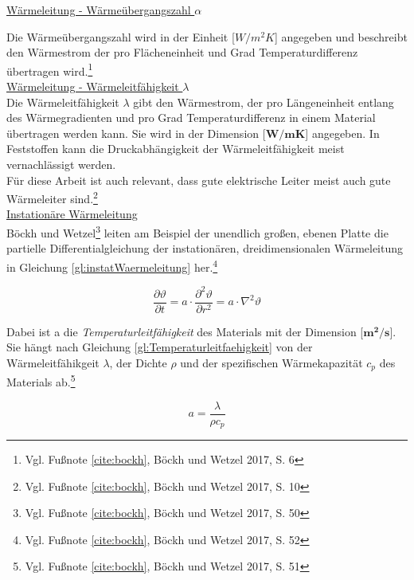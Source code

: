 \underline{Wärmeleitung - Wärmeübergangszahl $\alpha$}

Die Wärmeübergangszahl wird in der Einheit [$W/m^{2}K$] angegeben und beschreibt den Wärmestrom der pro Flächeneinheit und Grad Temperaturdifferenz übertragen wird.\footnote{Vgl. Fußnote \ref{cite:bockh}, Böckh und Wetzel 2017, S. 6}\\

\underline{Wärmeleitung - Wärmeleitfähigkeit $\lambda$}
\\

Die Wärmeleitfähigkeit $\lambda$ gibt den Wärmestrom, der pro Längeneinheit entlang des Wärmegradienten und pro Grad Temperaturdifferenz in einem Material übertragen werden kann. Sie wird in der Dimension [$\mathbf{W/mK}$] angegeben. In Feststoffen kann die Druckabhängigkeit der Wärmeleitfähigkeit meist vernachlässigt werden. \\
Für diese Arbeit ist auch relevant, dass gute elektrische Leiter meist auch gute Wärmeleiter sind.\footnote{Vgl. Fußnote \ref{cite:bockh}, Böckh und Wetzel 2017, S. 10} \\

\underline{Instationäre Wärmeleitung}
\\

Böckh und Wetzel\footnote{Vgl. Fußnote \ref{cite:bockh}, Böckh und Wetzel 2017, S. 50} leiten am Beispiel der unendlich großen, ebenen Platte die partielle Differentialgleichung der instationären, dreidimensionalen Wärmeleitung in Gleichung \ref{gl:instatWaermeleitung} her.\footnote{Vgl. Fußnote \ref{cite:bockh}, Böckh und Wetzel 2017, S. 52}

\begin{equation}
	\frac{\partial \vartheta}{\partial t} = a \cdot \frac{\partial^{2} \vartheta}{\partial r^{2}} = a \cdot \nabla^{2} \vartheta \label{gl:instatWaermeleitung}
\end{equation}

Dabei ist a die \textit{Temperaturleitfähigkeit} des Materials mit der Dimension [$\mathbf{m^{2}/s}$]. Sie hängt nach Gleichung \ref{gl:Temperaturleitfaehigkeit} von der Wärmeleitfähikgeit $\lambda$, der Dichte $\rho$ und der spezifischen Wärmekapazität $c_{p}$ des Materials ab.\footnote{Vgl. Fußnote \ref{cite:bockh}, Böckh und Wetzel 2017, S. 51}

\begin{equation}
	a = \frac{\lambda}{\rho c_{p}} \label{gl:Temperaturleitfaehigkeit}
\end{equation}

